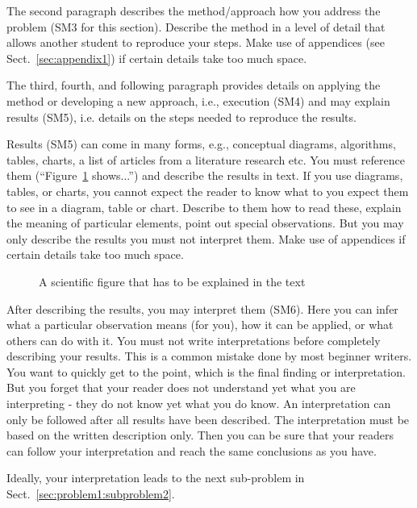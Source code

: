 \documentclass[12pt,a4paper,footinclude=true,twoside,headinclude=true]{report}
\begin{document}
\textsf{The second paragraph describes the method/approach how you address the problem (SM3 for this section).} Describe the method in a level of detail that allows another student to reproduce your steps. Make use of appendices (see Sect.~\ref{sec:appendix1}) if certain details take too much space.

\textsf{The third, fourth, and following paragraph provides details on applying the method or developing a new approach, i.e., execution (SM4) and may explain results (SM5)}, i.e. details on the steps needed to reproduce the results. 

Results (SM5) can come in many forms, e.g., conceptual diagrams, algorithms, tables, charts, a list of articles from a literature research etc. You must reference them (``Figure~\ref{fig:my_label} shows...'') and describe the results in text. If you use diagrams, tables, or charts, you cannot expect the reader to know what to you expect them to see in a diagram, table or chart. Describe to them how to read these, explain the meaning of particular elements, point out special observations. But you may only describe the results you must not interpret them. Make use of appendices if certain details take too much space.

\begin{figure}
    \centering
    \caption{A scientific figure that has to be explained in the text}
    \label{fig:my_label}
\end{figure}

\textsf{After describing the results, you may interpret them (SM6).} Here you can infer what a particular observation means (for you), how it can be applied, or what others can do with it. You must not write interpretations before completely describing your results. This is a common mistake done by most beginner writers. You want to quickly get to the point, which is the final finding or interpretation. But you forget that your reader does not understand yet what you are interpreting - they do not know yet what you do know. An interpretation can only be followed after all results have been described. The interpretation must be based on the written description only. Then you can be sure that your readers can follow your interpretation and reach the same conclusions as you have.

Ideally, your interpretation leads to the next sub-problem in Sect.~\ref{sec:problem1:subproblem2}.

\end{document}
